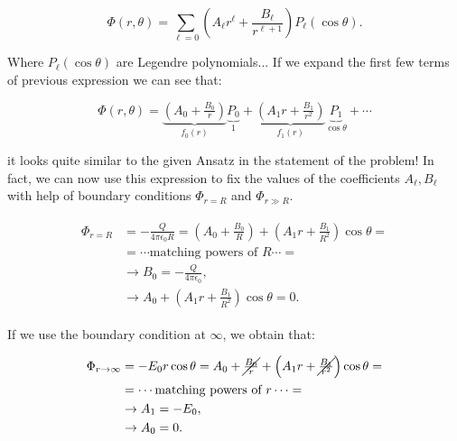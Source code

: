 \begin{equation}
	\Phi (r, \theta) = \sum_{\ell=0}^{} \left(A_{\ell} r^{\ell} + \frac{B_{\ell}}{r^{\ell+1}}\right) P_{\ell} (\cos \theta).
\end{equation}

Where $P_{\ell}(\cos \theta)$ are Legendre polynomials... If we expand the first few terms of previous expression we can see that:

\begin{equation}
	\Phi(r,\theta) = \underbrace{\left(A_{0} + \tfrac{B_{0}}{r}\right)}_{f_{0}(r)} \underbrace{P_{0}}_{1} + \underbrace{\left(A_{1} r  + \tfrac{B_{1}}{r^{2}}\right)}_{f_{1}(r)} \underbrace{P_{1}}_{\cos \theta} + \cdots
\end{equation}

it looks quite similar to the given Ansatz in the statement of the problem! In fact, we can now use this expression to fix the values of the coefficients $A_{\ell}, B_{\ell}$ with help of boundary conditions $\Phi_{r= R}$ and $\Phi_{r \gg R}$.

\begin{align}\label{finalfixing}
	\begin{split}
		\Phi_{r = R} &=   -\tfrac{Q}{4 \pi \epsilon_{0} R} = \left(A_{0} + \tfrac{B_{0}}{R}\right) + \left(A_{1} r  + \tfrac{B_{1}}{R^{2}}\right) \cos \theta =\\
		&= \cdots \text{matching powers of $R$}\cdots =\\
		&\rightarrow B_{0} = -\tfrac{Q}{4 \pi \epsilon_{0}},\\
		&\rightarrow  A_{0} +  \left(A_{1} r  + \tfrac{B_{1}}{R^{2}}\right) \cos \theta = 0.
	\end{split}
\end{align}

If we use the boundary condition at $\infty$, we obtain that:

\begin{align}
	\begin{split}
		\Phi_{r \rightarrow \infty} &=   -E_{0} r \cos \theta = A_{0} + \cancel{\tfrac{B_{0}}{r}} + \left(A_{1} r + \cancel{\tfrac{B_{1}}{r^{2}}} \right)\cos \theta =\\
		&= \cdots \text{matching powers of $r$}\cdots =\\
		&\rightarrow A_{1} = -E_{0},\\
		&\rightarrow  A_{0}  = 0.
	\end{split}
\end{align}

